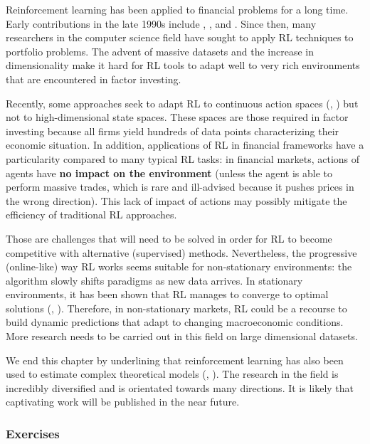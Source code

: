 Reinforcement learning has been applied to financial problems for a long time. Early contributions in the late 1990s include \cite{neuneier1996optimal}, \cite{moody1997optimization}, \cite{moody1998performance} and \cite{neuneier1998enhancing}. Since then, many researchers in the computer science field have sought to apply RL techniques to portfolio problems. The advent of massive datasets and the increase in dimensionality make it hard for RL tools to adapt well to very rich environments that are encountered in factor investing.

Recently, some approaches seek to adapt RL to continuous action spaces (\cite{wang2019continuous}, \cite{aboussalah2020continuous}) but not to high-dimensional state spaces. These spaces are those required in factor investing because all firms yield hundreds of data points characterizing their economic situation. In addition, applications of RL in financial frameworks have a particularity compared to many typical RL tasks: in financial markets, actions of agents have \textbf{no impact on the environment} (unless the agent is able to perform massive trades, which is rare and ill-advised because it pushes prices in the wrong direction). This lack of impact of actions may possibly mitigate the efficiency of traditional RL approaches.

Those are challenges that will need to be solved in order for RL to become competitive with alternative (supervised) methods. Nevertheless, the progressive (online-like) way RL works seems suitable for non-stationary environments: the algorithm slowly shifts paradigms as new data arrives. In stationary environments, it has been shown that RL manages to converge to optimal solutions (\cite{kong2019new}, \cite{chaouki2020deep}). Therefore, in non-stationary markets, RL could be a recourse to build dynamic predictions that adapt to changing macroeconomic conditions. More research needs to be carried out in this field on large dimensional datasets.

We end this chapter by underlining that reinforcement learning has also been used to estimate complex theoretical models (\cite{halperin2018market}, \cite{garcia2019continuous}). The research in the field is incredibly diversified and is orientated towards many directions. It is likely that captivating work will be published in the near future.

\subsubsection{Exercises}

